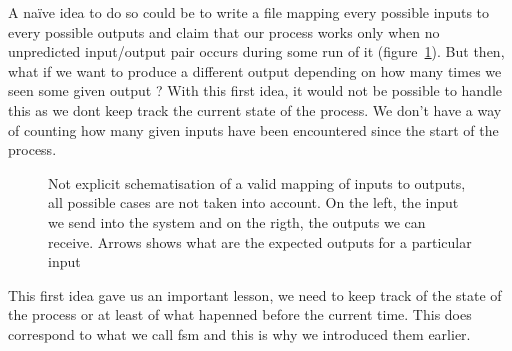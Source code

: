 \documentclass[12pt]{article}
\begin{document}
A naïve idea to do so could be to write a file mapping every possible inputs to every possible outputs and claim that our process works only when no unpredicted input/output pair occurs during some run of it (figure~\ref{io_map1}). But then, what if we want to produce a different output depending on how many times we seen some given output ? With this first idea, it would not be possible to handle this as we dont keep track the current state of the process. We don't have a way of counting how many given inputs have been encountered since the start of the process.\\

\begin{figure}
    \centering

    \caption{Not explicit schematisation of a valid mapping of inputs to outputs, all possible cases are not taken into account. On the left, the input we send into the system and on the rigth, the outputs we can receive. Arrows shows what are the expected outputs for a particular input}
    \label{io_map1}
\end{figure}

This first idea gave us an important lesson, we need to keep track of the state of the process or at least of what hapenned before the current time. This does correspond to what we call \gls{fsm} and this is why we introduced them earlier.\\
\end{document}
